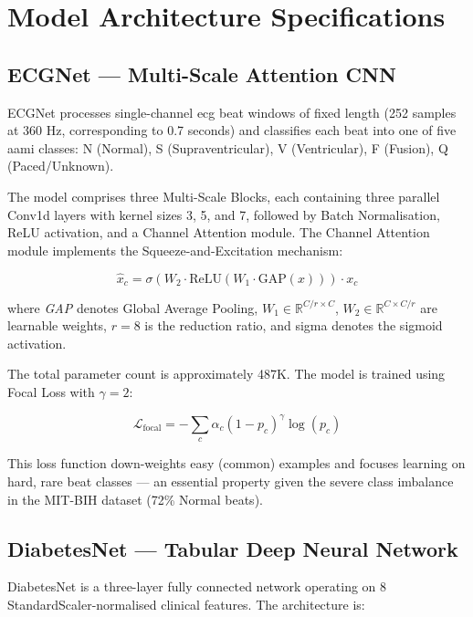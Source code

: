 \section{Model Architecture Specifications}

\subsection{ECGNet — Multi-Scale Attention CNN}

ECGNet processes single-channel \ac{ecg} beat windows of fixed length (252 samples at 360 Hz, corresponding to 0.7 seconds) and classifies each beat into one of five \ac{aami} classes: N (Normal), S (Supraventricular), V (Ventricular), F (Fusion), Q (Paced/Unknown).

The model comprises three Multi-Scale Blocks, each containing three parallel Conv1d layers with kernel sizes 3, 5, and 7, followed by Batch Normalisation, ReLU activation, and a Channel Attention module. The Channel Attention module implements the Squeeze-and-Excitation mechanism:

\begin{equation}
	\hat{x}_{c} = \sigma\!\left(W_2 \cdot \text{ReLU}(W_1 \cdot \text{GAP}(x))\right) \cdot x_c
\end{equation}

where \textit{GAP} denotes Global Average Pooling, $W_1 \in \mathbb{R}^{C/r \times C}$, $W_2 \in \mathbb{R}^{C \times C/r}$ are learnable weights, $r=8$ is the reduction ratio, and \ac{sigma} denotes the sigmoid activation.

The total parameter count is approximately 487K. The model is trained using Focal Loss with $\gamma = 2$:

\begin{equation}
	\mathcal{L}_{\text{focal}} = -\sum_{c} \alpha_c (1 - p_c)^{\gamma} \log(p_c)
\end{equation}

This loss function down-weights easy (common) examples and focuses learning on hard, rare beat classes — an essential property given the severe class imbalance in the MIT-BIH dataset (72\% Normal beats).

\subsection{DiabetesNet — Tabular Deep Neural Network}

DiabetesNet is a three-layer fully connected network operating on 8 StandardScaler-normalised clinical features. The architecture is:

